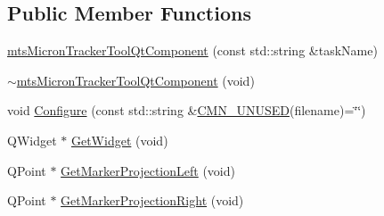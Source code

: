 \subsection*{Public Member Functions}
\begin{DoxyCompactItemize}
\item 
\hyperlink{classmts_micron_tracker_tool_qt_component_a69790b339315aa435a014712a8787d9e}{mts\+Micron\+Tracker\+Tool\+Qt\+Component} (const std\+::string \&task\+Name)
\item 
\hyperlink{classmts_micron_tracker_tool_qt_component_ad4146b1a0bbc819a136033184efaf0ff}{$\sim$mts\+Micron\+Tracker\+Tool\+Qt\+Component} (void)
\item 
void \hyperlink{classmts_micron_tracker_tool_qt_component_abe3134769529de5c477d42c085a3cc16}{Configure} (const std\+::string \&\hyperlink{cmn_portability_8h_a021894e2626935fa2305434b1e893ff6}{C\+M\+N\+\_\+\+U\+N\+U\+S\+E\+D}(filename)=\char`\"{}\char`\"{})
\item 
Q\+Widget $\ast$ \hyperlink{classmts_micron_tracker_tool_qt_component_a7626da8e9ee15cd6a3a0a7eb3f8b7720}{Get\+Widget} (void)
\item 
Q\+Point $\ast$ \hyperlink{classmts_micron_tracker_tool_qt_component_af2f02f25f64e575c479b72ccf719ef7e}{Get\+Marker\+Projection\+Left} (void)
\item 
Q\+Point $\ast$ \hyperlink{classmts_micron_tracker_tool_qt_component_a0d4e2a76d21e7f14919b7d51b19306c4}{Get\+Marker\+Projection\+Right} (void)
\end{DoxyCompactItemize}
